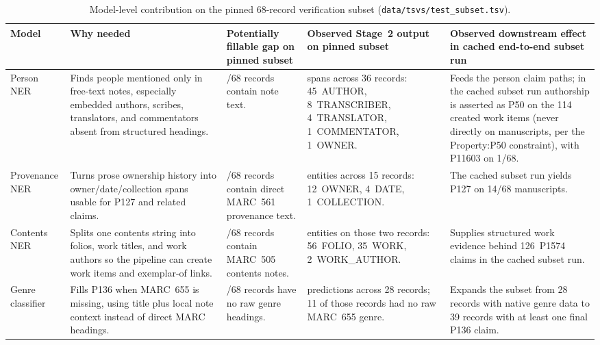\documentclass[Afour,sageh,times]{sagej}
\begin{document}
\begin{table}[t]
\caption{Model-level contribution on the pinned 68-record verification subset (\texttt{data/tsvs/test\_subset.tsv}).}
\label{tab:model-gap-subset}
\centering
\footnotesize
\begin{tabularx}{\textwidth}{>{\raggedright\arraybackslash}p{2.1cm} >{\raggedright\arraybackslash}X >{\raggedright\arraybackslash}p{2.5cm} >{\raggedright\arraybackslash}p{3.8cm} >{\raggedright\arraybackslash}X}
\toprule
\textbf{Model} & \textbf{Why needed} & \textbf{Potentially fillable gap on pinned subset} & \textbf{Observed Stage~2 output on pinned subset} & \textbf{Observed downstream effect in cached end-to-end subset run} \\
\midrule
Person NER & Finds people mentioned only in free-text notes, especially embedded authors, scribes, translators, and commentators absent from structured headings. & 68/68 records contain note text. & 59 spans across 36 records: 45~AUTHOR, 8~TRANSCRIBER, 4~TRANSLATOR, 1~COMMENTATOR, 1~OWNER. & Feeds the person claim paths; in the cached subset run authorship is asserted as P50 on the 114 created work items (never directly on manuscripts, per the Property:P50 constraint), with P11603 on 1/68. \\
\addlinespace
Provenance NER & Turns prose ownership history into owner/date/collection spans usable for P127 and related claims. & 36/68 records contain direct MARC~561 provenance text. & 13 entities across 15 records: 12~OWNER, 4~DATE, 1~COLLECTION. & The cached subset run yields P127 on 14/68 manuscripts. \\
\addlinespace
Contents NER & Splits one contents string into folios, work titles, and work authors so the pipeline can create work items and exemplar-of links. & 2/68 records contain MARC~505 contents notes. & 93 entities on those two records: 56~FOLIO, 35~WORK, 2~WORK\_AUTHOR. & Supplies structured work evidence behind 126~P1574 claims in the cached subset run. \\
\addlinespace
Genre classifier & Fills P136 when MARC~655 is missing, using title plus local note context instead of direct MARC headings. & 40/68 records have no raw genre headings. & 30 predictions across 28 records; 11 of those records had no raw MARC~655 genre. & Expands the subset from 28 records with native genre data to 39 records with at least one final P136 claim. \\
\bottomrule
\end{tabularx}
\end{table}
\end{document}
